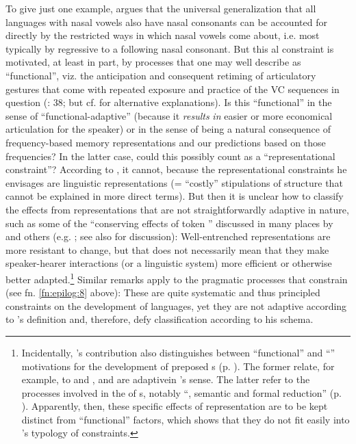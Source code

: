 \documentclass[output=paper]{langsci/langscibook}
\begin{document}
To give just one example,  argues that the universal generalization that all languages with nasal vowels also have nasal consonants can be accounted for directly by the restricted ways in which nasal vowels come about, i.e. most typically by regressive  to a following nasal consonant. But this al constraint is motivated, at least in part, by processes that one may well describe as “functional”, viz. the anticipation and consequent retiming of articulatory gestures that come with repeated exposure and practice of the VC sequences in question (\citealt{Bybee2015}: 38; but cf. \citealt{Ohala1989,Ohala2003} for alternative explanations). Is this “functional” in the sense of “functional-adaptive” (because it \textit{results} \textit{in} easier or more economical articulation for the speaker) or in the sense of being a natural consequence of frequency-based memory representations and our predictions based on those frequencies? In the latter case, could this possibly count as a “representational constraint”? According to , it cannot, because the representational constraints he envisages are  linguistic representations (= “costly” stipulations of structure that cannot be explained in more direct terms). But then it is unclear how to classify the  effects from  representations that are not straightforwardly adaptive in nature, such as some of the “conserving effects of token ” discussed in many places by  and others (e.g. \citealt{BybeeThompson1997,Pierrehumbert2001,Bybee2001}; see also \citealt{Cristofaro2015} for discussion): Well-entrenched representations are more resistant to change, but that does not necessarily mean that they make speaker-hearer interactions (or a linguistic system) more efficient or otherwise better adapted.\footnote{Incidentally, ’s contribution also distinguishes between “functional” and “” motivations for the development of preposed s (p. \pageref{p:diessel:preposedadverbialclauses}). The former relate, for example, to  and , and are adaptivein ’s sense. The latter refer to the  processes involved in the  of s, notably “, semantic  and formal reduction” (p. \pageref{p:xxx:automatization}). Apparently, then, these specific effects of  representation are to be kept distinct from “functional” factors, which shows that they do not fit easily into ’s typology of constraints.}  Similar remarks apply to the pragmatic processes that constrain  (see fn. \ref{fn:epilog:8} above): These are quite systematic and thus principled constraints on the development of languages, yet they are not adaptive according to ’s definition and, therefore, defy classification according to his schema.
\end{document}
